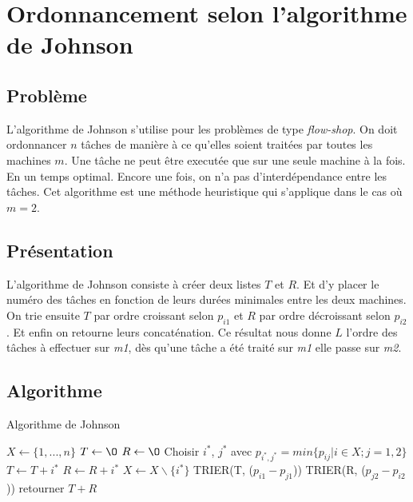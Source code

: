 \section{Ordonnancement selon l'algorithme de Johnson}
\subsection{Problème}
L'algorithme de Johnson s'utilise pour les problèmes de type {\em flow-shop}.
On doit ordonnancer $n$ tâches de manière à ce qu'elles soient traitées par
toutes les machines $m$.
Une tâche ne peut être executée que sur une seule machine à la
fois. En un temps optimal. Encore une fois, on n'a pas d'interdépendance entre
les tâches. Cet algorithme est une méthode heuristique qui s'applique 
dans le cas où $m=2$.

\subsection{Présentation}
L'algorithme de Johnson consiste à créer deux listes $T$ et $R$. Et d'y placer 
le numéro des tâches en fonction de leurs durées minimales entre les deux 
machines. On trie ensuite $T$ par ordre croissant selon $p_{i1}$ et $R$ par
ordre décroissant selon $p_{i2}$. Et enfin on retourne leurs concaténation.
Ce résultat nous donne $L$ l'ordre des tâches à effectuer sur {\em m1},
dès qu'une tâche a été traité sur {\em m1} elle passe sur {\em m2}.

\subsection{Algorithme}
\begin{algorithm}
\caption{Algorithme de Johnson}
\begin{algorithmic}
\STATE $X \leftarrow \{1,...,n\}$
\STATE $T \leftarrow \O$
\STATE $R \leftarrow \O$
	\STATE Choisir $i^*$, $j^*$ avec $p_{i^*,j^*} = min\{p_{ij}|i \in X; j = 1,2\}$
		\STATE $T \leftarrow T + i^*$
	\ELSE
		\STATE $R \leftarrow R + i^*$
	\ENDIF
	\STATE $X \leftarrow X\backslash\{i^*\}$
\ENDWHILE
\STATE TRIER(T, ($p_{i1} - p_{j1}$))
\STATE TRIER(R, ($p_{j2} - p_{i2}$))
\STATE retourner $T + R$
\end{algorithmic}
\end{algorithm}

